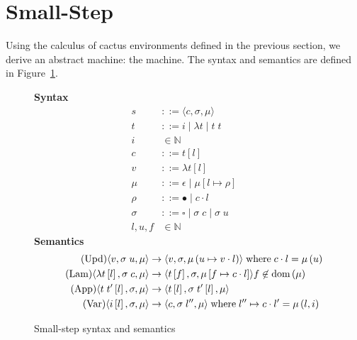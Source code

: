 \section{Small-Step \ce} \label{sec:mach}
Using the calculus of cactus environments defined in the previous section, we derive an abstract machine: the \ce machine. The syntax and semantics are
defined in Figure~\ref{fig:cesm}. 

\begin{figure}
\textbf{Syntax}
\begin{align*}
\tag{State} s &::= \langle c, \sigma, \mu \rangle \\
\tag{Term} t &::= i \; | \; \lambda t \; | \; t \; t  \\
\tag{Variable} i &\in \mathbb{N}  \\
\tag{Closure} c &::= t \left[l\right] \\
\tag{Value} v &::= \lambda t\left[l\right] \\
\tag{Heap} \mu &::= \epsilon \; | \; \mu \left[ l \mapsto \rho \right] \\
\tag{Environment} \rho &::= \bullet \; | \; c \cdot l \\
\tag{Stack} \sigma &::= \square \; | \; \sigma \; c \;  | \; \sigma \; u \\
\tag{Location} l,u,f &\in \mathbb{N}
\end{align*}
\textbf{Semantics}
\begin{align*}
\tag{Upd}
\langle v,  \sigma \; u , \mu \rangle 
  &\rightarrow
\langle v, \sigma, \mu\left(u \mapsto v \cdot l\right) \rangle  
\; \textnormal{where} \; c \cdot l = \mu\left(u\right) \\
\tag{Lam}
\langle \lambda t\left[l\right], \sigma \; c, \mu \rangle 
  &\rightarrow
\langle t\left[f\right], \sigma, \mu\left[f \mapsto c \cdot l\right]\rangle f
\not \in \textnormal{dom}\left(\mu\right)  \\
\tag{App}
\langle t \; t'\left[l\right], \sigma, \mu \rangle
  &\rightarrow
\langle t\left[l\right], \sigma \; t'\left[l\right], \mu \rangle \\
\tag{Var}
\langle i\left[l\right], \sigma, \mu \rangle
  &\rightarrow
\langle c, \sigma \; l'', \mu \rangle
\; \textnormal{where} \; l'' \mapsto c \cdot l' = \mu\left(l, i\right)
\end{align*}
\caption{Small-step \ce syntax and semantics}
\label{fig:cesm}
\end{figure}

